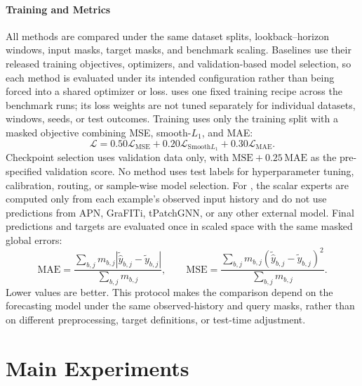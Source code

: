 \documentclass[preprint,12pt]{elsarticle}
\begin{document}
\paragraph{Training and Metrics}
All methods are compared under the same dataset splits, lookback--horizon
windows, input masks, target masks, and benchmark scaling. Baselines use their
released training objectives, optimizers, and validation-based model selection,
so each method is evaluated under its intended configuration rather than being
forced into a shared optimizer or loss. \method{} uses one fixed training
recipe across the benchmark runs; its loss weights are not tuned separately for
individual datasets, windows, seeds, or test outcomes. Training uses only the
training split with a masked objective combining MSE, smooth-$L_1$, and MAE:
\begin{equation}
    \mathcal L = 0.50\mathcal L_{\mathrm{MSE}}
    +0.20\mathcal L_{\mathrm{Smooth}L_1}
    +0.30\mathcal L_{\mathrm{MAE}}.
\end{equation}
Checkpoint selection uses validation data only, with
$\mathrm{MSE}+0.25\,\mathrm{MAE}$ as the pre-specified \method{} validation
score. No method uses test labels for hyperparameter tuning, calibration,
routing, or sample-wise model selection. For \method{}, the scalar experts are
computed only from each example's observed input history and do not use
predictions from APN, GraFITi, tPatchGNN, or any other external model. Final
predictions and targets are evaluated once in scaled space with the same masked
global errors:
\begin{equation}
    \mathrm{MAE}=\frac{\sum_{b,j}m_{b,j}
    |\widetilde{\hat y}_{b,j}-\widetilde y_{b,j}|}
    {\sum_{b,j}m_{b,j}},
    \qquad
    \mathrm{MSE}=\frac{\sum_{b,j}m_{b,j}
    (\widetilde{\hat y}_{b,j}-\widetilde y_{b,j})^2}
    {\sum_{b,j}m_{b,j}}.
\end{equation}
Lower values are better. This protocol makes the comparison depend on the
forecasting model under the same observed-history and query masks, rather than
on different preprocessing, target definitions, or test-time adjustment.

\section{Main Experiments}
\label{sec:main-experiments}
\end{document}
